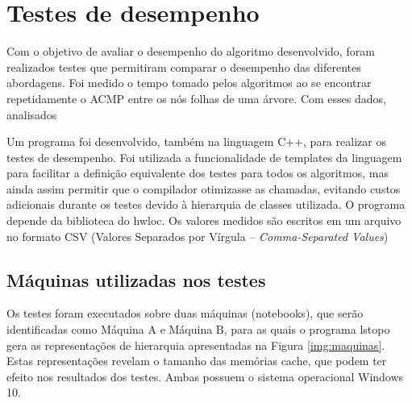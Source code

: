 
\chapter{Testes de desempenho}

Com o objetivo de avaliar o desempenho do algoritmo desenvolvido, foram realizados testes
que permitiram comparar o desempenho das diferentes abordagens.
Foi medido o tempo tomado pelos algoritmos
ao se encontrar repetidamente o ACMP entre os nós folhas de uma árvore.
Com esses dados, analisados

Um programa foi desenvolvido, também na linguagem C++, para realizar os testes de desempenho.
Foi utilizada a funcionalidade de templates da linguagem para facilitar a definição equivalente dos testes para todos os algoritmos, mas ainda assim permitir que o compilador otimizasse as chamadas, evitando custos adicionais durante os testes devido à hierarquia de classes utilizada.
O programa depende da biblioteca do hwloc.
Os valores medidos são escritos em um arquivo no formato CSV (Valores Separados por Vírgula -- \textit{Comma-Separated Values})


\section{Máquinas utilizadas nos testes}

Os testes foram executados sobre duas máquinas (notebooks), que serão identificadas como Máquina A e Máquina B, para as quais o programa lstopo gera as representações de hierarquia apresentadas na Figura \ref{img:maquinas}. Estas representações revelam o tamanho das memórias cache, que podem ter efeito nos resultados dos testes. Ambas possuem o sistema operacional Windows 10. 


